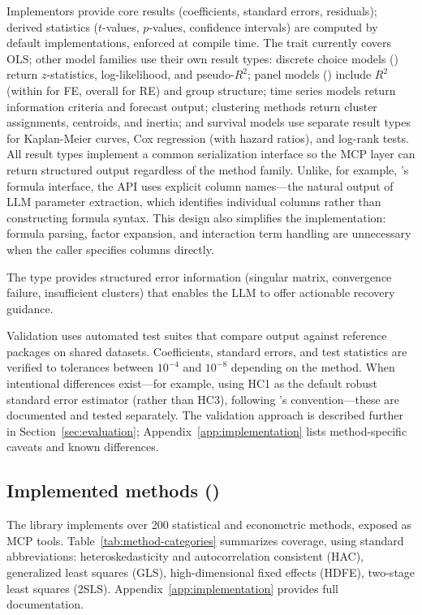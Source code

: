 \noindent Implementors provide core results (coefficients, standard
errors, residuals); derived statistics ($t$-values, $p$-values,
confidence intervals) are computed by default implementations, enforced
at compile time. The  trait currently covers OLS;
other model families use their own result types: discrete choice models
() return $z$-statistics, log-likelihood, and
pseudo-$R^2$; panel models () include $R^2$
(within for FE, overall for RE) and group structure; time
series models return information criteria and forecast output;
clustering methods return cluster assignments,
centroids, and inertia; and survival models use separate result types
for Kaplan-Meier curves, Cox regression (with hazard ratios), and
log-rank tests. All result types implement a common serialization
interface so the MCP layer can return structured output regardless of
the method family. Unlike, for example, 's
formula interface, the API uses explicit column names---the natural
output of LLM parameter extraction, which identifies individual
columns rather than constructing formula syntax. This design also
simplifies the implementation: formula parsing, factor expansion, and
interaction term handling are unnecessary when the caller specifies
columns directly.

The  type provides structured error information
(singular matrix, convergence failure, insufficient clusters) that
enables the LLM to offer actionable recovery guidance.

Validation uses automated test suites that compare 
output against reference  packages on shared datasets.
Coefficients, standard errors, and test statistics are verified to
tolerances between $10^{-4}$ and $10^{-8}$ depending on the method.
When intentional differences exist---for example, using HC1 as the
default robust standard error estimator (rather than HC3), following
's convention---these are documented and tested
separately. The validation
approach is described further in Section~\ref{sec:evaluation};
Appendix~\ref{app:implementation} lists method-specific caveats and
known differences.

\subsection[Implemented methods (p2a-core)]{Implemented methods ()}

The  library implements over 200 statistical and
econometric methods, exposed as MCP tools.
Table~\ref{tab:method-categories} summarizes coverage, using standard
abbreviations: heteroskedasticity and autocorrelation consistent (HAC),
generalized least squares (GLS), high-dimensional fixed effects (HDFE),
two-stage least squares (2SLS).
Appendix~\ref{app:implementation} provides full documentation.

